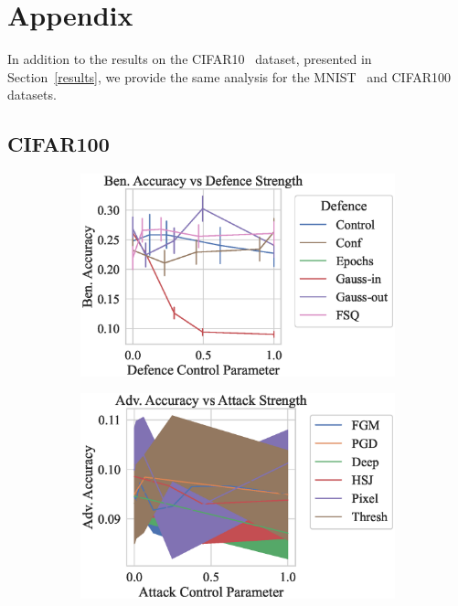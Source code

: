 \section{Appendix}
\label{appendix}

In addition to the results on the CIFAR10~\citep{cifar} dataset, presented in Section~\ref{results}, we provide the same analysis for the MNIST~\citep{mnist} and CIFAR100~\citep{cifar} datasets.


\subsection{CIFAR100}


\begin{figure}
    \centering
    \begin{subfigure}{0.45\textwidth}
        \centering
        \includegraphics[width=\textwidth]{cifar/def_param_vs_accuracy.eps}
    \end{subfigure}
    \begin{subfigure}{0.45\textwidth}
        \centering
        \includegraphics[width=\textwidth]{cifar/atk_param_vs_accuracy.eps}

\end{subfigure}
\end{figure}
